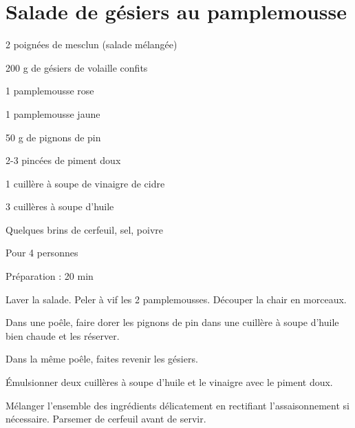 \section{Salade de gésiers au pamplemousse}

\begin{ingredients}
\item 2 poignées de mesclun (salade mélangée)
\item 200 g de gésiers de volaille confits
\item 1 pamplemousse rose
\item 1 pamplemousse jaune
\item 50 g de pignons de pin
\item 2-3 pincées de piment doux
\item 1 cuillère à soupe de vinaigre de cidre
\item 3 cuillères à soupe d'huile
\item Quelques brins de cerfeuil, sel, poivre
\end{ingredients}
\begin{infos}
\item Pour 4 personnes		%
\item Préparation : 20 min		%
\end{infos}
\begin{etapes}
\item Laver la salade. Peler à vif les 2 pamplemousses. Découper la chair en morceaux.
\item Dans une poêle, faire dorer les pignons de pin dans une cuillère à soupe d'huile bien chaude et les réserver.
\item Dans la même poêle, faites revenir les gésiers.
\item Émulsionner deux cuillères à soupe d'huile et le vinaigre avec le piment doux.
\item Mélanger l'ensemble des ingrédients délicatement en rectifiant l'assaisonnement si nécessaire. Parsemer de cerfeuil avant de servir.
\end{etapes}
\begin{conseils}
\end{conseils}
